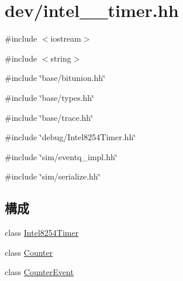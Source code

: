 \hypertarget{intel__8254__timer_8hh}{
\section{dev/intel\_\_\-timer.hh}
\label{intel__8254__timer_8hh}
}
{\ttfamily \#include $<$iostream$>$}\par
{\ttfamily \#include $<$string$>$}\par
{\ttfamily \#include \char`\"{}base/bitunion.hh\char`\"{}}\par
{\ttfamily \#include \char`\"{}base/types.hh\char`\"{}}\par
{\ttfamily \#include \char`\"{}base/trace.hh\char`\"{}}\par
{\ttfamily \#include \char`\"{}debug/Intel8254Timer.hh\char`\"{}}\par
{\ttfamily \#include \char`\"{}sim/eventq\_\-impl.hh\char`\"{}}\par
{\ttfamily \#include \char`\"{}sim/serialize.hh\char`\"{}}\par
\subsection*{構成}
\begin{DoxyCompactItemize}
\item 
class \hyperlink{classIntel8254Timer}{Intel8254Timer}
\item 
class \hyperlink{classIntel8254Timer_1_1Counter}{Counter}
\item 
class \hyperlink{classIntel8254Timer_1_1Counter_1_1CounterEvent}{CounterEvent}
\end{DoxyCompactItemize}
